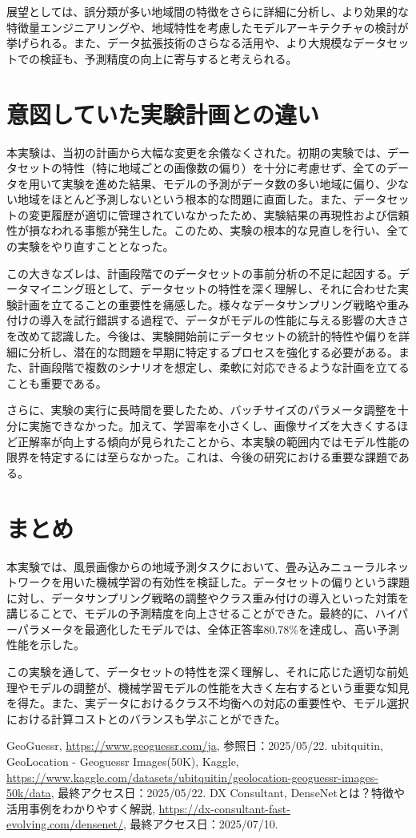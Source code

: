 \documentclass[a4paper, 11pt, titlepage]{jsarticle}
\begin{document}
展望としては、誤分類が多い地域間の特徴をさらに詳細に分析し、より効果的な特徴量エンジニアリングや、地域特性を考慮したモデルアーキテクチャの検討が挙げられる。また、データ拡張技術のさらなる活用や、より大規模なデータセットでの検証も、予測精度の向上に寄与すると考えられる。


\section{意図していた実験計画との違い}
本実験は、当初の計画から大幅な変更を余儀なくされた。初期の実験では、データセットの特性（特に地域ごとの画像数の偏り）を十分に考慮せず、全てのデータを用いて実験を進めた結果、モデルの予測がデータ数の多い地域に偏り、少ない地域をほとんど予測しないという根本的な問題に直面した。また、データセットの変更履歴が適切に管理されていなかったため、実験結果の再現性および信頼性が損なわれる事態が発生した。このため、実験の根本的な見直しを行い、全ての実験をやり直すこととなった。

この大きなズレは、計画段階でのデータセットの事前分析の不足に起因する。データマイニング班として、データセットの特性を深く理解し、それに合わせた実験計画を立てることの重要性を痛感した。様々なデータサンプリング戦略や重み付けの導入を試行錯誤する過程で、データがモデルの性能に与える影響の大きさを改めて認識した。今後は、実験開始前にデータセットの統計的特性や偏りを詳細に分析し、潜在的な問題を早期に特定するプロセスを強化する必要がある。また、計画段階で複数のシナリオを想定し、柔軟に対応できるような計画を立てることも重要である。

さらに、実験の実行に長時間を要したため、バッチサイズのパラメータ調整を十分に実施できなかった。加えて、学習率を小さくし、画像サイズを大きくするほど正解率が向上する傾向が見られたことから、本実験の範囲内ではモデル性能の限界を特定するには至らなかった。これは、今後の研究における重要な課題である。

\section{まとめ}
本実験では、風景画像からの地域予測タスクにおいて、畳み込みニューラルネットワークを用いた機械学習の有効性を検証した。データセットの偏りという課題に対し、データサンプリング戦略の調整やクラス重み付けの導入といった対策を講じることで、モデルの予測精度を向上させることができた。最終的に、ハイパーパラメータを最適化したモデルでは、全体正答率80.78\%を達成し、高い予測性能を示した。

この実験を通して、データセットの特性を深く理解し、それに応じた適切な前処理やモデルの調整が、機械学習モデルの性能を大きく左右するという重要な知見を得た。また、実データにおけるクラス不均衡への対応の重要性や、モデル選択における計算コストとのバランスも学ぶことができた。

\begin{thebibliography}{n}
GeoGuessr, \url{https://www.geoguessr.com/ja}, 参照日：2025/05/22.
ubitquitin, GeoLocation - Geoguessr Images(50K), Kaggle, \url{https://www.kaggle.com/datasets/ubitquitin/geolocation-geoguessr-images-50k/data}, 最終アクセス日：2025/05/22.
DX Consultant, DenseNetとは？特徴や活用事例をわかりやすく解説, \url{https://dx-consultant-fast-evolving.com/densenet/}, 最終アクセス日：2025/07/10.
\end{thebibliography}
\end{document}
